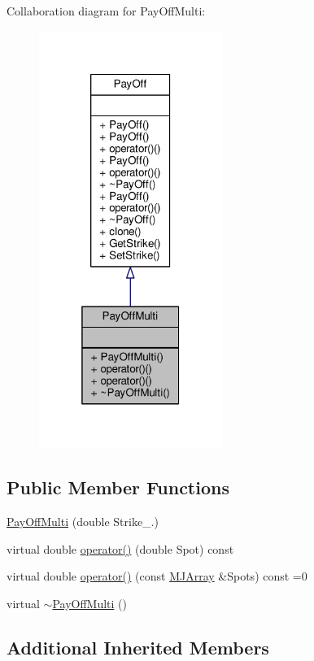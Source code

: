 Collaboration diagram for Pay\+Off\+Multi\+:
\nopagebreak
\begin{figure}[H]
\begin{center}
\leavevmode
\includegraphics[width=169pt]{classPayOffMulti__coll__graph}
\end{center}
\end{figure}
\subsection*{Public Member Functions}
\begin{DoxyCompactItemize}
\item 
\hyperlink{classPayOffMulti_ad1fecb3813a6d00d55dd9f72d7459237}{Pay\+Off\+Multi} (double Strike\+\_.)
\item 
virtual double \hyperlink{classPayOffMulti_a1fc1c64c8db3c7b17dd1e51062874775}{operator()} (double Spot) const
\item 
virtual double \hyperlink{classPayOffMulti_a61039e0c0ee136842b5d6f340b9f8155}{operator()} (const \hyperlink{classMJArray}{M\+J\+Array} \&Spots) const =0
\item 
virtual \hyperlink{classPayOffMulti_a148f588f7b00f744c2d755ae551d5e78}{$\sim$\+Pay\+Off\+Multi} ()
\end{DoxyCompactItemize}
\subsection*{Additional Inherited Members}


